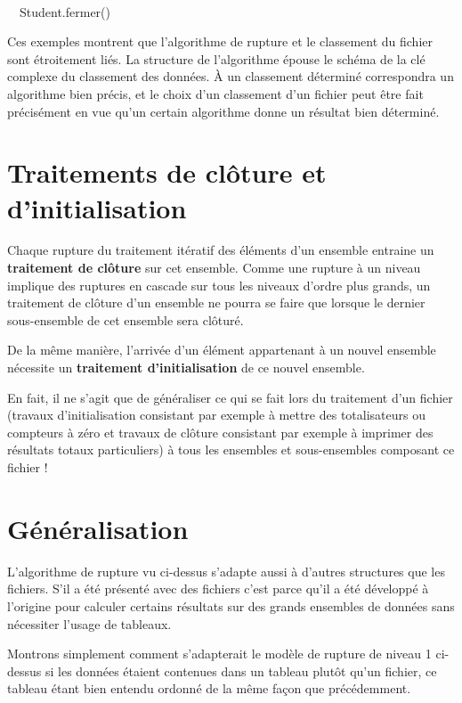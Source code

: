 {\sffamily
\ \    }

{\sffamily
\ \ Student.fermer()}

{\sffamily
{} }

{
Ces exemples montrent que l’algorithme de rupture et le classement du
fichier sont étroitement liés. La structure de l’algorithme épouse le
schéma de la clé complexe du classement des données. À un classement
déterminé correspondra un algorithme bien précis, et le choix d’un
classement d’un fichier peut être fait précisément en vue qu’un certain
algorithme donne un résultat bien déterminé.}

\section{Traitements de clôture et d’initialisation}
{
Chaque rupture du traitement itératif des éléments d’un ensemble
entraine un \textbf{traitement de clôture} sur cet ensemble. Comme une
rupture à un niveau implique des ruptures en cascade sur tous les
niveaux d’ordre plus grands, un traitement de clôture d’un ensemble ne
pourra se faire que lorsque le dernier sous-ensemble de cet ensemble
sera clôturé.}

{
De la même manière, l’arrivée d’un élément appartenant à un nouvel
ensemble nécessite un \textbf{traitement d’initialisation} de ce nouvel
ensemble.}

{
En fait, il ne s’agit que de généraliser ce qui se fait lors du
traitement d’un fichier (travaux d’initialisation consistant par
exemple à mettre des totalisateurs ou compteurs à zéro et travaux de
clôture consistant par exemple à imprimer des résultats totaux
particuliers) à tous les ensembles et sous-ensembles composant ce
fichier !}

\section{Généralisation}
{
L’algorithme de rupture vu ci-dessus s’adapte aussi à d’autres
structures que les fichiers. S’il a été présenté avec des fichiers
c’est parce qu’il a été développé à l’origine pour calculer certains
résultats sur des grands ensembles de données sans nécessiter l’usage
de tableaux. }

{
Montrons simplement comment s’adapterait le modèle de rupture de niveau
1 ci-dessus si les données étaient contenues dans un tableau plutôt
qu’un fichier, ce tableau étant bien entendu ordonné de la même façon
que précédemment.}

